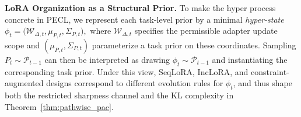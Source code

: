 \documentclass{article}
\theoremstyle{plain}
\theoremstyle{definition}
\theoremstyle{remark}
\begin{document}



\noindent\textbf{LoRA Organization as a Structural Prior.}\quad 
To make the hyper process concrete in PECL, we represent each task-level prior by a minimal \emph{hyper-state}
$
\phi_t = \bigl(\mathcal W_{\Delta,t},\mu_{P,t},\Sigma_{P,t}\bigr),
$
where $\mathcal W_{\Delta,t}$ specifies the permissible adapter update scope and $(\mu_{P,t},\Sigma_{P,t})$ parameterize a task prior on these coordinates.
Sampling $P_t\sim\mathcal P_{t-1}$ can then be interpreted as drawing $\phi_t\sim\mathcal P_{t-1}$ and instantiating the corresponding task prior. Under this view, SeqLoRA, IncLoRA, and constraint-augmented designs correspond to different evolution rules for $\phi_t$, and thus shape both the restricted sharpness channel and the KL complexity in Theorem~\ref{thm:pathwise_pac}.
\end{document}
